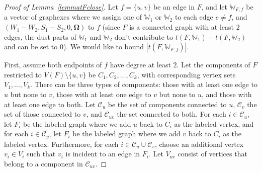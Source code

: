 \documentclass{amsart}
\numberwithin{equation}{section}
\numberwithin{figure}{section}
\theoremstyle{definition}
\theoremstyle{remark}
\newcommand{\bOmega}{{\mathbf{\Omega}}}
\newcommand{\cW}{\mathbb{W}}
\newcommand{\cC}{\mathcal{C}}
\begin{document}
\begin{proof}[Proof of Lemma~\ref{lemmatFclose}]
Let $f=\{u,v\}$ be an edge in $F$, and let $\cW_{F,f}$ be a vector of
graphexes where we assign one of $\cW_1$ or $\cW_2$ to each edge $e \ne f$,
and $(W_1-W_2,S_1-S_2,0,\bOmega)$ to $f$ (since $F$ is a connected graph with
at least $2$ edges, the dust parts of $\cW_1$ and $\cW_2$ don't contribute to
$t(F,\cW_1)-t(F,\cW_2)$ and can be set to $0$). We would like to bound
$|t(F,\cW_{F,f})|$.

First, assume both endpoints of $f$ have degree at least $2$. Let the
components of $F$ restricted to $V(F) \setminus \{u,v\}$ be
$C_1,C_2,\dots,C_k$, with corresponding vertex sets $V_1,\dots,V_k$. There
can be three types of components: those with at least one edge to $u$ but
none to $v$, those with at least one edge to $v$ but none to $u$, and those
with at least one edge to both. Let $\cC_u$ be the set of components
connected to $u$, $\cC_v$ the set of those connected to $v$, and $\cC_{uv}$
the set connected to both. For each $i \in \cC_u$, let $F_i$ be the labeled
graph where we add $u$ back to $C_i$ as the labeled vertex, and for each $i
\in \cC_y$, let $F_i$ be the labeled graph where we add $v$ back to $C_i$ as
the labeled vertex. Furthermore, for each $i\in \cC_u\cup \cC_v$, choose an
additional vertex $v_i\in V_i$ such that $v_i$ is incident to an edge in
$F_i$. Let $V_{uv}$ consist of vertices that belong to a component in
$\cC_{uv}$.


\end{proof}
\end{document}

